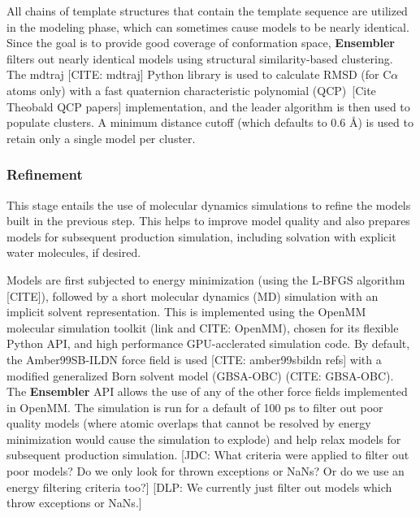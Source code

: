 \documentclass[aps,pre,twocolumn,nofootinbib,superscriptaddress,linenumbers]{revtex4-1}
\begin{document}
All chains of template structures that contain the template sequence are utilized in the modeling phase, which can sometimes cause models to be nearly identical.
Since the goal is to provide good coverage of conformation space, {\bf Ensembler} filters out nearly identical models using structural similarity-based clustering.
The mdtraj {\color{red}[CITE: mdtraj]} Python library is used to calculate RMSD (for C$\alpha$ atoms only) with a fast quaternion characteristic polynomial (QCP)~{\color{red}[Cite Theobald QCP papers]} implementation, and the leader algorithm is then used to populate clusters.
A minimum distance cutoff (which defaults to 0.6 \AA) is used to retain only a single model per cluster.

\subsubsection*{Refinement}

This stage entails the use of molecular dynamics simulations to refine the models built in the previous step.
This helps to improve model quality and also prepares models for subsequent production simulation, including solvation with explicit water molecules, if desired.

Models are first subjected to energy minimization (using the L-BFGS algorithm {\color{red}[CITE]}), followed by a short molecular dynamics (MD) simulation with an implicit solvent representation.
This is implemented using the OpenMM molecular simulation toolkit (link and CITE: OpenMM), chosen for its flexible Python API, and high performance GPU-acclerated simulation code.
By default, the Amber99SB-ILDN force field is used {\color{red}[CITE: amber99sbildn refs]} with a modified generalized Born solvent model (GBSA-OBC) (CITE: GBSA-OBC).
The {\bf Ensembler} API allows the use of any of the other force fields implemented in OpenMM.
The simulation is run for a default of 100 ps to filter out poor quality models (where atomic overlaps that cannot be resolved by energy minimization would cause the simulation to explode) and help relax models for subsequent production simulation.
{\color{red}[JDC: What criteria were applied to filter out poor models?  Do we only look for thrown exceptions or NaNs?  Or do we use an energy filtering criteria too?]}
{\color{blue}[DLP: We currently just filter out models which throw exceptions or NaNs.]}
\end{document}
